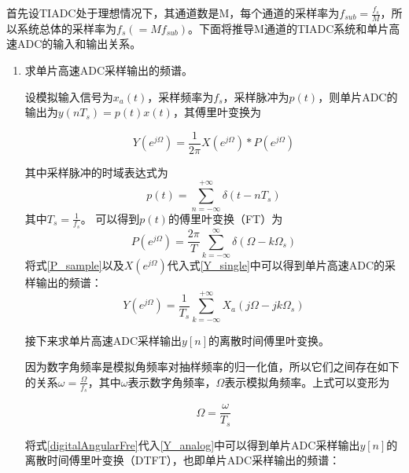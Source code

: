	
	首先设TIADC处于理想情况下，其通道数是M，每个通道的采样率为$f_{sub}=\frac{f_s}{M}$，所以系统总体的采样率为$f_s(=Mf_{sub})$。下面将推导M通道的TIADC系统和单片高速ADC的输入和输出关系。
		\par
	\begin{enumerate}
		\item 求单片高速ADC采样输出的频谱。\par
			设模拟输入信号为${x_a}(t)$，采样频率为$f_s$，采样脉冲为$p(t)$，则单片ADC的输出为$y(nT_s)=p(t)x(t)$，其傅里叶变换为
		
			\begin{equation}
				Y\left( {{e^{j\Omega }}} \right) = \frac{1}{{2\pi }}X\left( {{e^{j\Omega }}} \right)*P\left( {{e^{j\Omega }}} \right)\label{Y_single}
			\end{equation}

			其中采样脉冲的时域表达式为
			\begin{equation}
				p(t) = \sum\limits_{n =  - \infty }^{ + \infty } {\delta (t - n{T_s})} 			
			\end{equation}
			其中$T_s=\frac{1}{f_s}$。
			可以得到$p(t)$的傅里叶变换（FT）为
			\begin{equation}
				P\left( {{e^{j\Omega }}} \right) = \frac{{2\pi }}{T}\sum\limits_{k =  - \infty }^\infty  {\delta \left( {\Omega  - k{\Omega _s}} \right)}  \label{P_sample}
			\end{equation}
		将式\ref{P_sample}以及$X(e^{j\Omega })$代入式\ref{Y_single}中可以得到单片高速ADC的采样输出的频谱：
			\begin{equation}
				Y\left( {{e^{j\Omega }}} \right) = \frac{1}{{{T_s}}}\sum\limits_{k =  - \infty }^{ + \infty } {{X_a}\left( {j\Omega  - jk{\Omega _s}} \right)}  \label{Y_analog}
			\end{equation}
			
			接下来求单片高速ADC采样输出$y[n]$的离散时间傅里叶变换。\par			因为数字角频率是模拟角频率对抽样频率的归一化值，所以它们之间存在如下的关系$\omega = \frac{\Omega }{f_s}$，其中$\omega$表示数字角频率，$\Omega$表示模拟角频率。上式可以变形为
			
				\begin{equation}
					\Omega = \frac{\omega }{T_s} \label{digitalAngularFre}
				\end{equation}
				
			将式\ref{digitalAngularFre}代入\ref{Y_analog}中可以得到单片ADC采样输出$y[n]$的离散时间傅里叶变换（DTFT），也即单片ADC采样输出的频谱：
			

\end{enumerate}
